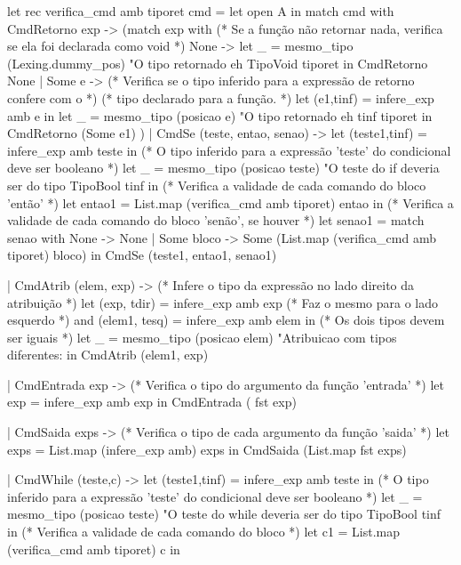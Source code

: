 \documentclass[12pt,a4paper,twoside]{article}
\begin{document}
\begin{terminal}
let rec verifica_cmd amb tiporet cmd =
  let open A in
  match cmd with
    CmdRetorno exp ->
    (match exp with
     (* Se a função não retornar nada, verifica se ela foi declarada como void *)
       None ->
       let _ = mesmo_tipo (Lexing.dummy_pos)
                   "O tipo retornado eh %
                   TipoVoid tiporet
       in CmdRetorno None
     | Some e ->
       (* Verifica se o tipo inferido para a expressão de retorno confere com o *)
       (* tipo declarado para a função.                                         *)
           let (e1,tinf) = infere_exp amb e in
           let _ = mesmo_tipo (posicao e)
                              "O tipo retornado eh %
                              tinf tiporet
           in CmdRetorno (Some e1)
      )
  | CmdSe (teste, entao, senao) ->
    let (teste1,tinf) = infere_exp amb teste in
    (* O tipo inferido para a expressão 'teste' do condicional deve ser booleano *)
    let _ = mesmo_tipo (posicao teste)
             "O teste do if deveria ser do tipo %
             TipoBool tinf in
    (* Verifica a validade de cada comando do bloco 'então' *)
    let entao1 = List.map (verifica_cmd amb tiporet) entao in
    (* Verifica a validade de cada comando do bloco 'senão', se houver *)
    let senao1 =
        match senao with
          None -> None
        | Some bloco -> Some (List.map (verifica_cmd amb tiporet) bloco)
     in
     CmdSe (teste1, entao1, senao1)

  | CmdAtrib (elem, exp) ->
    (* Infere o tipo da expressão no lado direito da atribuição *)
    let (exp,  tdir) = infere_exp amb exp
    (* Faz o mesmo para o lado esquerdo *)
    and (elem1, tesq) = infere_exp amb elem in
    (* Os dois tipos devem ser iguais *)
    let _ = mesmo_tipo (posicao elem)
                       "Atribuicao com tipos diferentes: %
    in CmdAtrib (elem1, exp)

  | CmdEntrada exp ->
    (* Verifica o tipo do argumento da função 'entrada' *)
    let exp = infere_exp amb exp in
    CmdEntrada ( fst exp)

  | CmdSaida exps ->
    (* Verifica o tipo de cada argumento da função 'saida' *)
    let exps = List.map (infere_exp amb) exps in
    CmdSaida (List.map fst exps)

  | CmdWhile (teste,c) ->
    let (teste1,tinf) = infere_exp amb teste in
    (* O tipo inferido para a expressão 'teste' do condicional deve ser booleano *)
    let _ = mesmo_tipo (posicao teste)
             "O teste do while deveria ser do tipo %
             TipoBool tinf in
    (* Verifica a validade de cada comando do bloco  *)
    let c1 = List.map (verifica_cmd amb tiporet) c in
    

\end{terminal}
\end{document}
